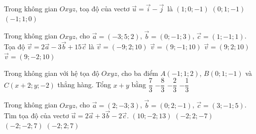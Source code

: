 \begin{ex}%
	Trong không gian $Oxyz$, toạ độ  của vectơ $\overrightarrow{u}=\overrightarrow{i}-\overrightarrow{j}$~là
		{$(1;  0;-1)$}
		 {$(0; 1;-1)$}
		 {$(-1; 1; 0)$}
\end{ex}

\begin{ex}%
	Trong không gian $Oxyz$, cho $\overrightarrow{a}=(-3;5;2)$,  $\overrightarrow{b}=(0;-1;3)$, $\overrightarrow{c}=(1;-1;1)$. Tọa độ $\overrightarrow{v}=2\overrightarrow{a}-3\overrightarrow{b}+15\overrightarrow{c}$ là
	 \choice
		{$\overrightarrow{v}=(-9;2;10)$} 
		{$\overrightarrow{v}=(9;-1;10)$} 
		{$\overrightarrow{v}=(9;2;10)$} 
		{\True $\overrightarrow{v}=(9;-2;10)$} 
\end{ex}

\begin{ex}%
	 Trong không gian với hệ tọa độ $Oxyz$, cho ba điểm $A(-1;1;2)$, $B(0;1;-1)$ và $C(x+2;y;-2)$ thẳng hàng. Tổng $x+y$ bằng
	 \choice
		{$\dfrac{7}{3}$} 
		 {$-\dfrac{8}{3}$}
		 {\True$-\dfrac{2}{3}$}
		{$-\dfrac{1}{3}$} 
\end{ex}

\begin{ex}%
	Trong không gian $Oxyz$, cho $\overrightarrow{a}=(2;-3;  3)$, $\overrightarrow{b}=(0; 2;-1)$, $\overrightarrow{c}=(3;-1; 5)$. Tìm tọa độ của vectơ $\overrightarrow{u}=2 \overrightarrow{a}+3 \overrightarrow{b}-2 \overrightarrow{c}$.
	\choice 
		 {$(10;-2; 13)$}
		 {\True $(-2; 2;-7)$}
		{$(-2;-2; 7)$} 
		 {$(-2; 2; 7)$}
\end{ex}

